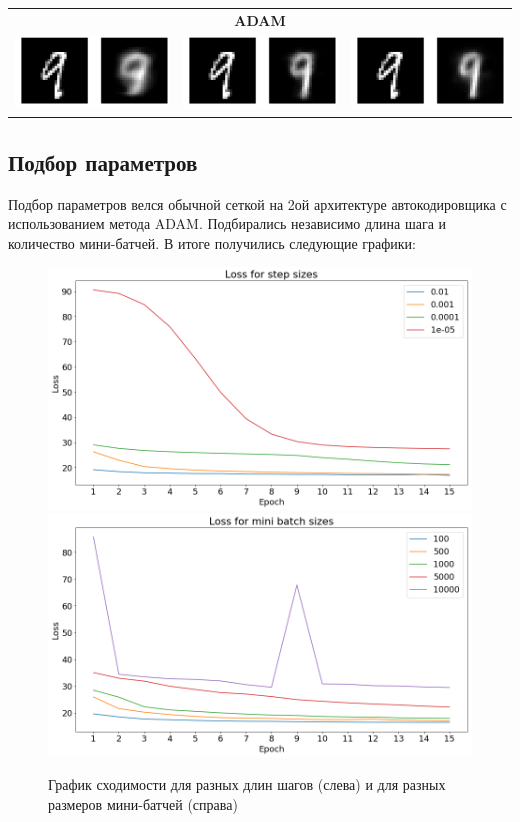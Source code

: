 \documentclass[12pt, a4paper]{article}
\begin{document}
\begin{table}
\begin{tabular}{c c c}
                \multicolumn{3}{c}{\textbf{ADAM}}\\
                \includegraphics[width=0.3\linewidth]{pics/arch1_adam} &
                \includegraphics[width=0.3\linewidth]{pics/arch2_adam} &
                \includegraphics[width=0.3\linewidth]{pics/arch3_adam} \\
            \end{tabular}
            \end{table}

        \subsection{Подбор параметров}
            Подбор параметров велся обычной сеткой на 2ой архитектуре автокодировщика с использованием метода ADAM. Подбирались независимо длина шага и количество мини-батчей. В итоге получились следующие графики:
            \begin{figure}[h]
                \centering
                \includegraphics[width=0.49\linewidth]{pics/loss_step}
                \includegraphics[width=0.49\linewidth]{pics/loss_batch}
                \caption{График сходимости для разных длин шагов (слева) и для разных размеров мини-батчей (справа)}
                \label{fig:params}
            \end{figure}
\end{document}
